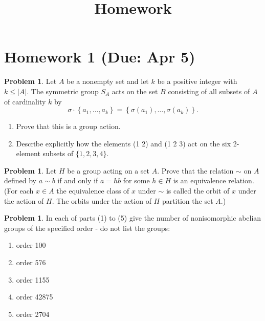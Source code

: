 \documentclass{amsart}
\title{Homework}
\numberwithin{equation}{section}
\theoremstyle{definition}
\newtheorem{problem}[thm]{Problem}
\begin{document}
\maketitle
\tableofcontents

\newpage
\section{Homework 1 (Due: Apr 5)}

\begin{problem}
 Let \(A\) be a nonempty set and let \(k\) be a positive integer with \(k \leq|A|\). The symmetric group \(S_A\) acts on the set \(B\) consisting of all subsets of \(A\) of cardinality \(k\) by 
 \[
   \sigma \cdot\left\{a_1, \ldots, a_k\right\}= \left\{\sigma\left(a_1\right), \ldots, \sigma\left(a_k\right)\right\}.
 \]
 \begin{enumerate}
 \item Prove that this is a group action.
 \item Describe explicitly how the elements (1 2) and (1 2 3) act on the six 2-element subsets of \(\{1,2,3,4\}\).
 \end{enumerate}
\end{problem}



\begin{problem}
  Let \(H\) be a group acting on a set \(A\). Prove that the relation
  \(\sim\) on \(A\) defined by \(a \sim b \) if and only if
  \( a=h b \) for some \(h \in H\) is an equivalence
  relation. (For each \(x \in A\) the equivalence class of \(x\) under
  \(\sim\) is called the orbit of \(x\) under the action of \(H\). The
  orbits under the action of \(H\) partition the set \(A\).)
\end{problem}



\begin{problem}
 In each of parts (1) to (5) give the number of nonisomorphic abelian groups of the specified order - do not list the groups:
\begin{enumerate}
\item order 100
\item order 576
\item order 1155
\item order 42875
\item order 2704
\end{enumerate}
\end{problem}
\end{document}
